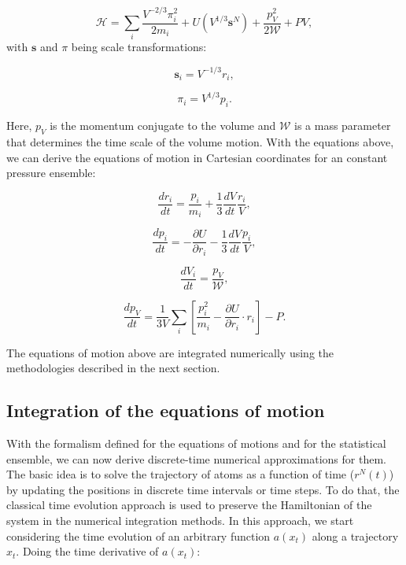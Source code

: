 \begin{equation}
\mathcal{H} =  \sum_{i} \frac{V^{-2/3} \pi _{i}^{2}}{2 m_{i}} + U(V^{1/3} \mathbf{s}^{N})  + \frac{p_{V} ^{2} }{2\mathcal{W}} + PV,
\end{equation}
with $\mathbf{s}$ and $\pi$ being scale transformations:

\begin{equation}
\mathbf{s} _{i} =  V^{-1/3} r_{i} ,
\end{equation}

\begin{equation}
\pi _{i} =  V^{1/3} p _{i}.
\end{equation}

Here, $p_{V} $ is the momentum conjugate to the volume and $\mathcal{W}$ is a mass parameter that determines the time scale of the volume motion. With the equations above, we can derive the equations of motion in Cartesian coordinates for an constant pressure ensemble:

\begin{equation}
\frac{dr_{i}}{dt} = \frac{p_{i}}{m_{i}} + \frac{1}{3} \frac{dV}{dt} \frac{r_{i}}{V},
\end{equation}

\begin{equation}
\frac{dp_{i}}{dt} = -  \frac{\partial U}{\partial r_{i}} - \frac{1}{3} \frac{dV}{dt} \frac{p_{i}}{V},
\end{equation}

\begin{equation}
\frac{dV_{i}}{dt} = \frac{p_{V}}{\mathcal{W}},
\end{equation}

\begin{equation}
\frac{dp_{V}}{dt} = \frac{1}{3V} \sum_{i} \left [ \frac{p_{i}^{2}}{m_{i}} -  \frac{\partial U}{\partial r_{i}} \cdot r_{i} \right] -P.
\end{equation}

The equations of motion above are integrated numerically using the methodologies described in the next section.

\subsection{Integration of the equations of motion}

With the formalism defined for the equations of motions and for the statistical ensemble, we can now derive discrete-time numerical approximations for them.  The basic idea is to solve the trajectory of atoms as a function of time ($r^{N}(t)$) by updating the positions in discrete time intervals or time steps. To do that, the classical time evolution approach is used to preserve the Hamiltonian of the system in the numerical integration methods. In this approach, we start considering the time evolution of an arbitrary function $a(x_{t})$ along a trajectory $x_{t}$. Doing the time derivative of $a(x_{t})$:

